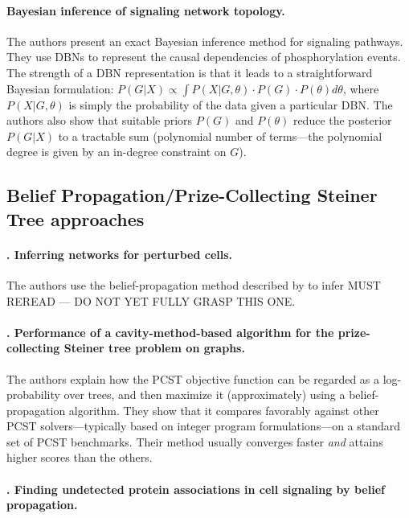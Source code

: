 \documentclass[14pt]{article}
\begin{document}
\paragraph{ \citet{hill-bayesian-2012} Bayesian inference of signaling network topology.}
The authors present an exact Bayesian inference method for signaling pathways.
They use DBNs to represent the causal dependencies of phosphorylation events.
The strength of a DBN representation is that it leads to a straightforward Bayesian formulation:
$P(G|X) \propto \int P(X|G, \theta) \cdot P(G) \cdot P(\theta) d\theta$, where $P(X|G, \theta)$ is
simply the probability of the data given a particular DBN.
The authors also show that suitable priors $P(G)$ and $P(\theta)$ reduce the posterior $P(G|X)$
to a tractable sum (polynomial number of terms---the polynomial degree is given by an in-degree constraint on $G$).


\subsection{Belief Propagation/Prize-Collecting Steiner Tree approaches}

\paragraph{ \citet{2013-molinelli-perturbation}. Inferring networks for perturbed cells.}
The authors use the belief-propagation method described by \citeauthor{2012-biazzo-steiner} to infer 
MUST REREAD --- DO NOT YET FULLY GRASP THIS ONE.

\paragraph{ \citet{2012-biazzo-steiner}. Performance of a cavity-method-based algorithm for the prize-collecting Steiner tree problem on graphs.}
The authors explain how the PCST objective function can be regarded as a log-probability over trees, and then maximize it (approximately) using a belief-propagation algorithm.
They show that it compares favorably against other PCST solvers---typically based on integer program formulations---on a standard set of PCST benchmarks.
Their method usually converges faster \emph{and} attains higher scores than the others.

\paragraph{ \citet{2011-bailly-bechet-belief}. Finding undetected protein associations in cell signaling by belief propagation.}
\end{document}
